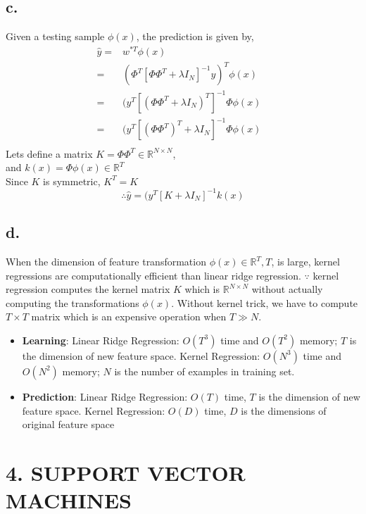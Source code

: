 \documentclass[letterpaper,doc,notimes]{apa6}
\begin{document}
\subsection{c. }
Given a testing sample $\phi(x)$, the prediction is given by,\\
\begin{align*}
	\hat{y} =& w^{*T} \phi(x) & \\
				=&	(\Phi^T[ \Phi\Phi^T +  \lambda I_N ]^{-1} y)^T \phi(x) & \\
				=&	(y^T [ (\Phi\Phi^T +  \lambda I_N)^T ]^{-1} \Phi \phi(x) & \\
				=&	(y^T [(\Phi\Phi^T)^T +  \lambda I_N]^{-1} \Phi \phi(x) & \\				
\end{align*}
Lets define a matrix $K = \Phi\Phi^T \in \mathbb{R}^{N \times N}$, \\
and $k(x) = \Phi\phi(x) \in \mathbb{R}^T$ \\
Since $K$ is symmetric, $K^T = K$
$$ \therefore \hat{y} = (y^T [K+  \lambda I_N]^{-1} k(x)  $$

\subsection{d. }
When the dimension of feature transformation $\phi(x) \in \mathbb{R}^T, T$, is large, kernel regressions are computationally efficient than linear ridge regression.
$\because$ kernel regression computes the kernel matrix $K  $ which is $\mathbb{R}^{N\times N}$ without actually computing the transformations $\phi(x)$.
Without kernel trick, we have to compute $T \times T$ matrix which is an expensive operation when $T  \gg N$. 
\begin{itemize}
	\item \textbf{Learning}:
		\subitem Linear Ridge Regression: $O(T^3)$ time and $O(T^2)$ memory; $T$ is the dimension of new feature space.
		\subitem Kernel  Regression: $O(N^3)$ time and $O(N^2)$ memory; $N$ is the number of examples in training set.
	\item \textbf{Prediction}: 
		\subitem Linear Ridge Regression: $O(T)$ time, $T$ is the dimension of new feature space.
		\subitem Kernel Regression: $O(D)$ time, $D$ is the dimensions of original feature space
\end{itemize}

\section{4. SUPPORT VECTOR MACHINES}
\end{document}
